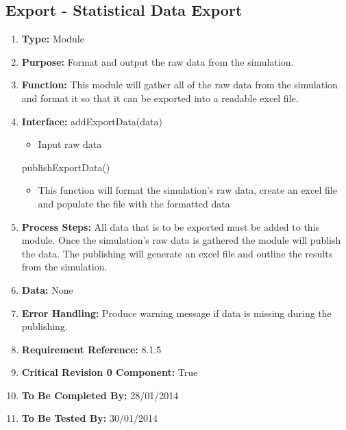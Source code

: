 \documentclass[paper=letter, fontsize=10pt]{scrartcl}
\numberwithin{equation}{section}		%
\numberwithin{figure}{section}			%
\numberwithin{table}{section}				%
\begin{document}
\subsection{Export - Statistical Data Export}
\begin{enumerate}[]
	\item \textbf{Type:} Module
	\item \textbf{Purpose:} Format and output the raw data from the simulation.
	\item \textbf{Function:} This module will gather all of the raw data from the simulation and format it  so that it can be exported into a readable excel file.
	\item \textbf{Interface:}
	addExportData(data)
	\begin{itemize}
		\item Input raw data
	\end{itemize}
	publishExportData()
	\begin{itemize}
		\item This function will format the simulation's raw data, create an excel file and populate the file with the formatted data
	\end{itemize}
	\item \textbf{Process Steps:} All data that is to be exported must be added to this module.  Once the simulation's raw data is gathered the module will publish the data.  The publishing will generate an excel file and outline the results from the simulation.
	\item \textbf{Data:} None
	\item \textbf{Error Handling:}  Produce warning message if data is missing during the publishing.
	\item \textbf{Requirement Reference:} 8.1.5
	\item \textbf{Critical Revision 0 Component:} True
	\item \textbf{To Be Completed By:} 28/01/2014
	\item \textbf{To Be Tested By:} 30/01/2014
\end{enumerate}
\end{document}
